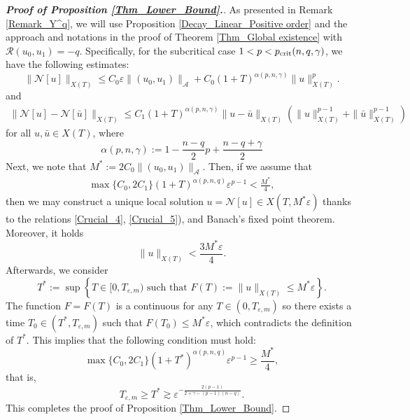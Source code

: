 \documentclass[11pt,reqno]{amsart}
\newtheorem{remark}{Remark}[section]
\begin{document}
\begin{proof}[\textbf{Proof of Proposition \ref{Thm_Lower_Bound}.}]
As presented in Remark \ref{Remark_Y^q}, we will use Proposition \ref{Decay_Linear_Positive order}  and the approach and notations in the proof of Theorem \ref{Thm_Global existence} with $\mathcal{R}(u_0, u_1) = -q$.
Specifically, for the subcritical case $1 < p < p_{\rm crit}(n,q,\gamma)$, we have the following estimates:
\begin{equation}\label{Crucial_4}
\|\mathcal{N}[u]\|_{X(T)}\leq C_0\varepsilon \|(u_0, u_1)\|_{\mathcal{A}}+C_0(1+T)^{\alpha(p,n,\gamma)}\|u\|_{X(T)}^p.
\end{equation}
and
\begin{align}\label{Crucial_5}
  \|\mathcal{N}[u]-\mathcal{N}[\bar{u}]\|_{X(T)} \leq C_1 (1+T)^{\alpha(p,n, \gamma)}\|u-\bar{u}\|_{X(T)} \left(\|u\|_{X(T)}^{p-1} + \|\bar{u}\|_{X(T)}^{p-1}\right)  
\end{align}
for all $u, \bar{u} \in X(T)$,
where $$\alpha(p,n,\gamma):=1-\frac{n-q}{2}p+\frac{n-q+\gamma}{2}$$
Next, we note that
$
    M^*:= 2C_0 \|(u_0, u_1)\|_{\mathcal{A}}.
$
Then, if we assume that
\begin{align*}
    \max\{C_0, 2C_1\}(1+T)^{\alpha(p,n,q)} \varepsilon^{p-1}< \frac{M^*}{4}, 
\end{align*}
then we may construct a unique local solution $u = \mathcal{N}[u] \in X(T, M^*\varepsilon)$ thanks to the relations \eqref{Crucial_4}, \eqref{Crucial_5}), and Banach's fixed point theorem. Moreover, it holds
$$
\|u\|_{X(T)} < \frac{3M^*\varepsilon}{4}.
$$
Afterwards, we consider
$$
T^*:=\sup\left\{ T\in[0,T_{\varepsilon,m}) \text{ such that } F(T):=\|u\|_{X(T)}\leq M^*\varepsilon \right\}.
$$
The function $F=F(T)$ is a continuous for any $T\in(0,T_{\varepsilon,m})$ so there exists a time $T_0\in(T^*,T_{\varepsilon,m})$ such that $F(T_0)\leq M^*\varepsilon$, which contradicts the definition of $T^*$. This implies that the following condition must hold:
$$
 \max\{C_0, 2C_1\}(1+T^*)^{\alpha(p,n,q)} \varepsilon^{p-1} \geq \frac{M^*}{4}, 
$$
that is,
$$
T_{\varepsilon,m} \geq T^* \gtrsim \varepsilon^{-\frac{2(p-1)}{2+\gamma-(p-1)(n-q)}}.
$$
This completes the proof of Proposition \ref{Thm_Lower_Bound}.
\end{proof}
\end{document}

